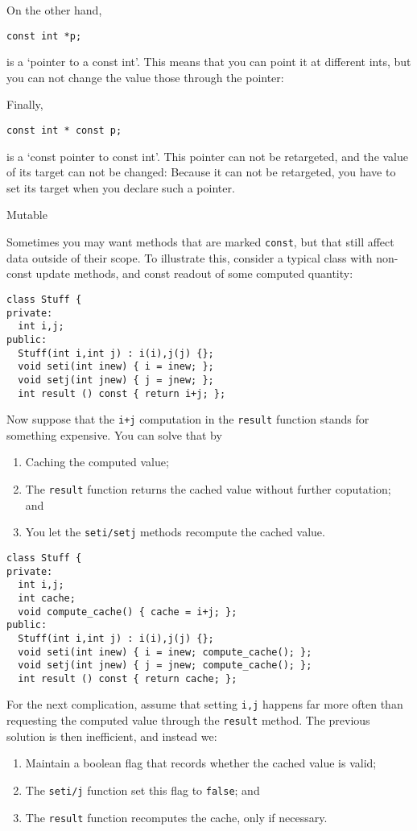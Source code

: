 On the other hand,
\begin{lstlisting}
const int *p;
\end{lstlisting}
is a `pointer to a const int'.
This means that you can point it at different ints,
but you can not change the value those through the pointer:

Finally,
\begin{lstlisting}
const int * const p;
\end{lstlisting}
is a `const pointer to const int'.
This pointer can not be retargeted, and the value
of its target can not be changed:
Because it can not be retargeted,
you have to set its target when you declare such a pointer.

 {Mutable}

Sometimes you may want methods that are marked \lstinline{const},
but that still affect data outside of their scope.
To illustrate this, consider a
typical class with non-const update methods,
and const readout of some computed quantity:

\begin{lstlisting}
class Stuff {
private:
  int i,j;
public:
  Stuff(int i,int j) : i(i),j(j) {};
  void seti(int inew) { i = inew; };
  void setj(int jnew) { j = jnew; };
  int result () const { return i+j; };
\end{lstlisting}

Now suppose that the \lstinline|i+j| computation in the \lstinline{result} function
stands for something expensive.
You can solve that by
\begin{enumerate}
\item Caching the computed value;
\item The \lstinline{result} function returns the cached value without
  further coputation; and
\item You let the \lstinline{seti/setj} methods recompute the cached value.
\end{enumerate}

\begin{lstlisting}
class Stuff {
private:
  int i,j;
  int cache;
  void compute_cache() { cache = i+j; };
public:
  Stuff(int i,int j) : i(i),j(j) {};
  void seti(int inew) { i = inew; compute_cache(); };
  void setj(int jnew) { j = jnew; compute_cache(); };
  int result () const { return cache; };
\end{lstlisting}

For the next complication, assume that setting \lstinline{i,j}
happens far more often than requesting the computed value
through the \lstinline{result} method.
The previous solution is then inefficient, and instead we:
\begin{enumerate}
\item Maintain a boolean flag that records whether the cached value is valid;
\item The \lstinline{seti/j} function set this flag to \lstinline{false}; and
\item The \lstinline{result} function recomputes the cache, only if necessary.
\end{enumerate}

